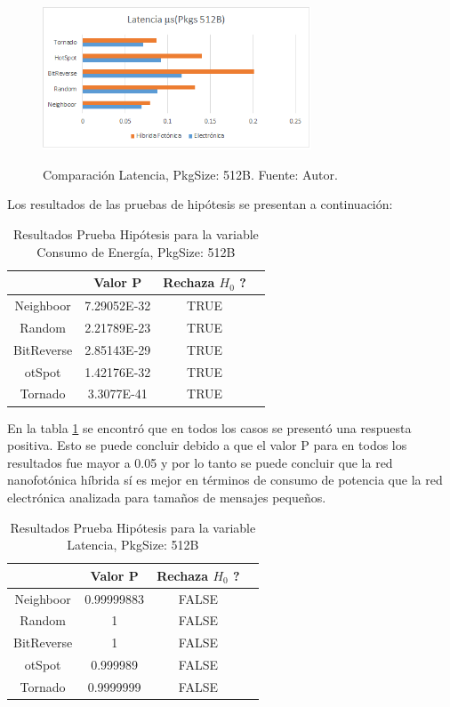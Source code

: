 \documentclass{IEEEtran}
\begin{document}
\begin{figure}[]
\caption{Comparación Latencia, PkgSize: 512B. Fuente: Autor.}
\centering
\includegraphics[width=8cm,natwidth=483,natheight=256]{figs/L512.png}
\label{fig:l512}
\end{figure} 

Los resultados de las pruebas de hipótesis se presentan a continuación:
 
\begin{table}[]
\centering
\begin{tabular}{|c|c|c|c|}
\hline
&Valor P&Rechaza $H_0$ ?\\
\hline
Neighboor&7.29052E-32&TRUE\\
Random&2.21789E-23&TRUE\\
BitReverse&2.85143E-29&TRUE\\
otSpot&1.42176E-32&TRUE\\
Tornado&3.3077E-41&TRUE\\
\hline
\end{tabular}
\caption{Resultados Prueba Hipótesis para la variable Consumo de Energía, PkgSize: 512B}
\label{tb:ettest512}
\end{table}

En la tabla \ref{tb:ettest512} se encontró que en todos los casos se presentó una
respuesta positiva. Esto se puede concluir debido a que el valor P para
en todos los resultados fue mayor a 0.05 y por lo tanto se puede concluir que 
la red nanofotónica híbrida sí es mejor en términos de consumo de potencia
que la red electrónica analizada para tamaños de mensajes pequeños.


\begin{table}[]
\centering
\begin{tabular}{|c|c|c|c|}
\hline
&Valor P&Rechaza $H_0$ ?\\
\hline
Neighboor&0.99999883&FALSE\\
Random&1&FALSE\\
BitReverse&1&FALSE\\
otSpot&0.999989&FALSE\\
Tornado&0.9999999&FALSE\\
\hline
\end{tabular}
\caption{Resultados Prueba Hipótesis para la variable Latencia, PkgSize: 512B}
\label{tb:lttest512}
\end{table}
\end{document}
